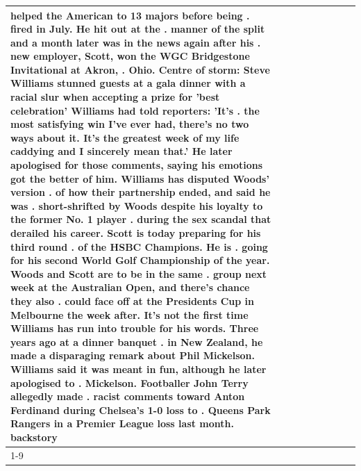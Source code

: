 \begin{table}[H]
\begin{tabular}{lllrlllll}
helped the American to 13 majors before being . fired in July. He hit out at the . manner of the split and a month later was in the news again after his . new employer, Scott, won the WGC Bridgestone Invitational at Akron, . Ohio. Centre of storm: Steve Williams stunned guests at a gala dinner with a racial slur when accepting a prize for 'best celebration' Williams had told reporters: 'It's . the most satisfying win I've ever had, there's no two ways about it. It's the greatest week of my life caddying and I sincerely mean that.' He later apologised for those comments, saying his emotions got the better of him. Williams has disputed Woods' version . of how their partnership ended, and said he was . short-shrifted by Woods despite his loyalty to the former No. 1 player . during the sex scandal that derailed his career. Scott is today preparing for his third round . of the HSBC Champions. He is . going for his second World Golf Championship of the year. Woods and Scott are to be in the same . group next week at the Australian Open, and there's chance they also . could face off at the Presidents Cup in Melbourne the week after. It's not the first time Williams has run into trouble for his words. Three years ago at a dinner banquet . in New Zealand, he made a disparaging remark about Phil Mickelson. Williams said it was meant in fun, although he later apologised to . Mickelson. Footballer John Terry allegedly made . racist comments toward Anton Ferdinand during Chelsea's 1-0 loss to . Queens Park Rangers in a Premier League loss last month. backstory \\
\cline{1-9}

\end{tabular}
\end{table}
